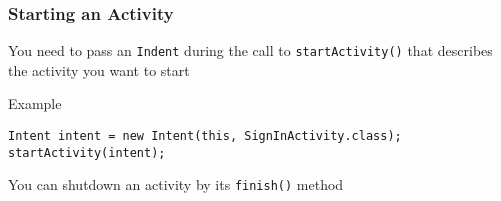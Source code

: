 %
%

\begin{frame}[fragile]
  \frametitle{Starting an Activity}
  

  You need to pass an \texttt{Indent} during the call to
  \lstinline{startActivity()} that describes the activity you want to
  start

  \begin{exampleblock}{Example}
\begin{lstlisting}
Intent intent = new Intent(this, SignInActivity.class);
startActivity(intent);
\end{lstlisting}
  \end{exampleblock}

  You can shutdown an activity by its \lstinline{finish()} method

\end{frame}

